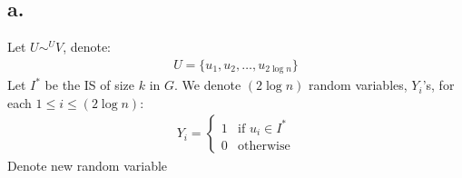 \documentclass[11pt]{article}
\theoremstyle{plain}
\theoremstyle{nonumberplainnobrackets}
\begin{document}
\subsection*{a.}
%
Let $U\sim^{U} V$, denote:
\begin{align*}
U = \{ u_1,u_2,\ldots,u_{2\log n}	 \}
\end{align*}
Let $I^*$ be the IS of size $k$ in $G$. We denote $(2\log n)$ random variables, $Y_i$'s, for each $1\le i \le (2 \log n)$:
	\begin{align*}
Y_i = \begin{cases}
1  & \text{if } u_i\in I^* \\
0  & \text{otherwise}
\end{cases} 
\end{align*}
Denote new random variable
\end{document}
